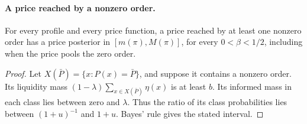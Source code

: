 \paragraph{A price reached by a nonzero order.}
For every profile and every price function, a price reached by at least one nonzero order has a price posterior
in \([m(\pi),M(\pi)]\), for every \(0<\beta<1/2\), including when the price pools the zero order.

\begin{proof}
Let \(X(\bar P)=\{x:P(x)=\bar P\}\), and suppose it contains a nonzero order. Its liquidity mass
\((1-\lambda)\sum_{x\in X(\bar P)}\eta(x)\) is at least \(b\). Its informed mass in each class lies between zero
and \(\lambda\). Thus the ratio of its class probabilities lies between \((1+u)^{-1}\) and \(1+u\). Bayes' rule
gives the stated interval.
\end{proof}
